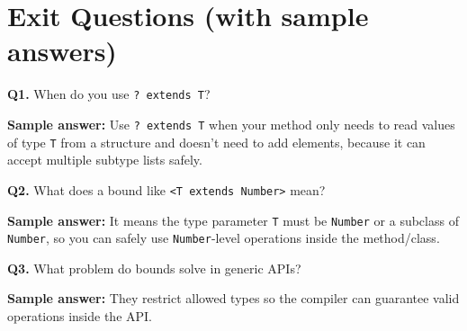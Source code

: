 \documentclass[11pt]{article}
\begin{document}
\section{Exit Questions (with sample answers)}
\textbf{Q1.} When do you use \texttt{? extends T}?\par
\textbf{Sample answer:} Use \texttt{? extends T} when your method only needs to read values of type \texttt{T} from a structure and doesn't need to add elements, because it can accept multiple subtype lists safely.

\vspace{0.6em}
\textbf{Q2.} What does a bound like \texttt{<T extends Number>} mean?\par
\textbf{Sample answer:} It means the type parameter \texttt{T} must be \texttt{Number} or a subclass of \texttt{Number}, so you can safely use \texttt{Number}-level operations inside the method/class.

\vspace{0.6em}
\textbf{Q3.} What problem do bounds solve in generic APIs?\par
\textbf{Sample answer:} They restrict allowed types so the compiler can guarantee valid operations inside the API.
\end{document}
